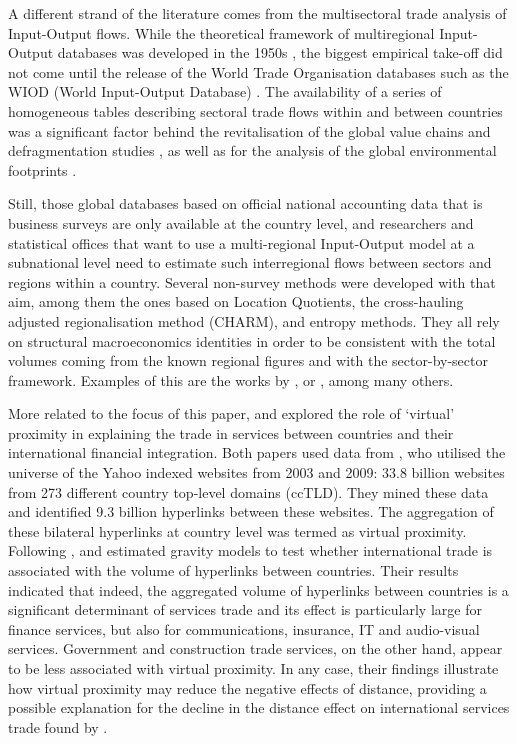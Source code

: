 \documentclass[]{interact}
\theoremstyle{plain}%
\theoremstyle{definition}
\theoremstyle{remark}
\begin{document}
A different strand of the literature comes from the multisectoral trade
analysis of Input-Output flows. While the theoretical framework of
multiregional Input-Output databases was developed in the 1950s
\citep{isard1956location}, the biggest empirical take-off did not come
until the release of the World Trade Organisation databases such as the
WIOD (World Input-Output Database)
\citep{dietzenbacher2013construction}. The availability of a series of
homogeneous tables describing sectoral trade flows within and between
countries was a significant factor behind the revitalisation of the
global value chains and defragmentation studies
\citep{timmer2015illustrated, los2015global, los2016tracing, antras2018measurement},
as well as for the analysis of the global environmental footprints
\citep{arto2014comparing, owen2016explaining}.

Still, those global databases based on official national accounting data
that is business surveys are only available at the country level, and
researchers and statistical offices that want to use a multi-regional
Input-Output model at a subnational level need to estimate such
interregional flows between sectors and regions within a country.
Several non-survey methods were developed with that aim, among them the
ones based on Location Quotients, the cross-hauling adjusted
regionalisation method (CHARM), and entropy methods. They all rely on
structural macroeconomics identities in order to be consistent with the
total volumes coming from the known regional figures and with the
sector-by-sector framework. Examples of this are the works by
\citet{sargento2012inter}, \citet{tobben2015construction} or
\citet{boero2018regional}, among many others.

More related to the focus of this paper, \citet{hellmanzik2016gravity}
and \citet{hellmanzik2017taking} explored the role of `virtual'
proximity in explaining the trade in services between countries and
their international financial integration. Both papers used data from
\citet{chung2011geography}, who utilised the universe of the Yahoo
indexed websites from 2003 and 2009: 33.8 billion websites from 273
different country top-level domains (ccTLD). They mined these data and
identified 9.3 billion hyperlinks between these websites. The
aggregation of these bilateral hyperlinks at country level was termed as
virtual proximity. Following \citet{kimura2006gravity},
\citet{hellmanzik2016gravity} and \citet{hellmanzik2017taking} estimated
gravity models to test whether international trade is associated with
the volume of hyperlinks between countries. Their results indicated that
indeed, the aggregated volume of hyperlinks between countries is a
significant determinant of services trade and its effect is particularly
large for finance services, but also for communications, insurance, IT
and audio-visual services. Government and construction trade services,
on the other hand, appear to be less associated with virtual proximity.
In any case, their findings illustrate how virtual proximity may reduce
the negative effects of distance, providing a possible explanation for
the decline in the distance effect on international services trade found
by \citet{head2009remote}.
\end{document}

